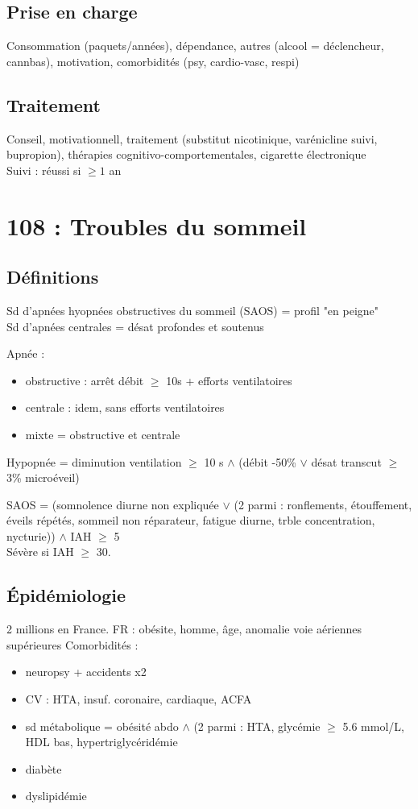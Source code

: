 \documentclass{article}
\newcommand*{\TakeFourierOrnament}[1]{{%
\fontencoding{U}\fontfamily{futs}\selectfont\char#1}}
\newcommand*{\danger}{\TakeFourierOrnament{66}}
\begin{document}
\subsection{Prise en charge}
Consommation (paquets/années), dépendance, autres (alcool = déclencheur,
cannbas), motivation, comorbidités (psy, cardio-vasc, respi)
\subsection{Traitement}
Conseil, motivationnell, traitement (substitut nicotinique, varénicline \danger
suivi, bupropion), thérapies cognitivo-comportementales, cigarette
électronique\\
Suivi : réussi si \(\ge 1\) an



\section{108 : Troubles du sommeil}
\subsection{Définitions}
\danger Sd d'apnées hyopnées obstructives du sommeil (SAOS) = profil "en peigne"\\
Sd d'apnées centrales = désat profondes et soutenus

Apnée : 
\begin{itemize}
  \item obstructive : arrêt débit \(\ge\) 10s + efforts ventilatoires
  \item centrale : idem, sans efforts ventilatoires
  \item mixte = obstructive et centrale
\end{itemize}
Hypopnée = diminution ventilation \(\ge\) 10 s \(\wedge\) (débit -50\% \(\vee\) désat
transcut \(\ge\) 3\% \textpm{} microéveil)

SAOS = (somnolence diurne non expliquée \(\vee\) (2 parmi : ronflements, étouffement,
éveils répétés, sommeil non réparateur, fatigue diurne, trble concentration,
nycturie)) \(\wedge{}\)  IAH \(\ge\) 5\\
Sévère si IAH \(\ge\) 30.
\subsection{Épidémiologie}
2 millions en France.
FR : obésite, homme, âge, anomalie voie aériennes supérieures
Comorbidités :
\begin{itemize}
  \item neuropsy + accidents x2
  \item CV : HTA, insuf. coronaire, cardiaque, ACFA
  \item sd métabolique = obésité abdo \(\wedge\) (2 parmi : HTA, glycémie \(\ge\) 5.6 mmol/L,
    HDL bas, hypertriglycéridémie
  \item diabète
  \item dyslipidémie
\end{itemize}
\end{document}
